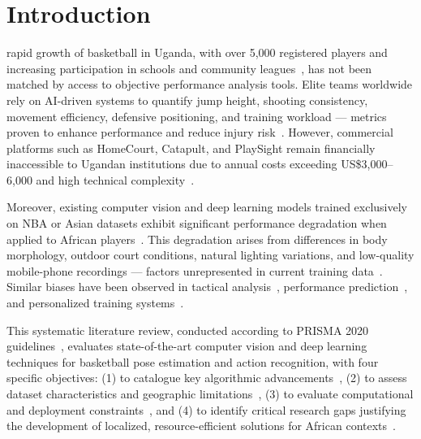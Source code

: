 \documentclass[conference]{IEEEtran}
\begin{document}
\section{Introduction}
 rapid growth of basketball in Uganda, with over 5,000 registered players and increasing participation in schools and community leagues~\cite{li2021application,yan2023review}, has not been matched by access to objective performance analysis tools. Elite teams worldwide rely on AI-driven systems to quantify jump height, shooting consistency, movement efficiency, defensive positioning, and training workload — metrics proven to enhance performance and reduce injury risk~\cite{su2022score,nguyen2021mlsport,li2021shooting,yan2023review}. However, commercial platforms such as HomeCourt, Catapult, and PlaySight remain financially inaccessible to Ugandan institutions due to annual costs exceeding US\$3,000--6,000 and high technical complexity~\cite{li2021application}.

Moreover, existing computer vision and deep learning models trained exclusively on NBA or Asian datasets exhibit significant performance degradation when applied to African players~\cite{li2023yolo,sha2025capsnet,cheng2022ann,zhang2025sensor}. This degradation arises from differences in body morphology, outdoor court conditions, natural lighting variations, and low-quality mobile-phone recordings — factors unrepresented in current training data~\cite{tian2019strategies,ding2025thermal}. Similar biases have been observed in tactical analysis~\cite{li2025defensive,nagorna2025tactical}, performance prediction~\cite{yan2024xgboost,wang2022explainable,stacked2025ensemble}, and personalized training systems~\cite{libin2025personalized,yang2020training,song2022dribbling}.

This systematic literature review, conducted according to PRISMA 2020 guidelines~\cite{prisma2020}, evaluates state-of-the-art computer vision and deep learning techniques for basketball pose estimation and action recognition, with four specific objectives:  
(1) to catalogue key algorithmic advancements~\cite{li2023yolo,zhang2024acahet,sha2025capsnet,wang2024hoop},  
(2) to assess dataset characteristics and geographic limitations~\cite{tian2019strategies,nguyen2021mlsport},  
(3) to evaluate computational and deployment constraints~\cite{yan2024xgboost,wang2022explainable}, and  
(4) to identify critical research gaps justifying the development of localized, resource-efficient solutions for African contexts~\cite{li2025defensive,libin2025personalized,ding2025thermal,li2021shooting}.
\end{document}
